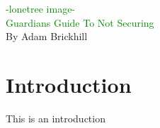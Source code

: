 \documentclass{article}
\begin{document}
\begin{titlepage}
	\begin{center}
		\huge{\textcolor{green}{-lonetree image-}}\\
		[7cm]
		\Huge{\textcolor{green}{Guardians Guide To Not Securing}}\\
		[9cm]
		\large{By Adam Brickhill}\\
	\end{center}
\end{titlepage}

\setcounter{page}{0}
\tableofcontents
\newpage

\section*{Introduction}
\justify This is an introduction

\begin{flushleft}
	
	{}
\end{flushleft}
\end{document}
